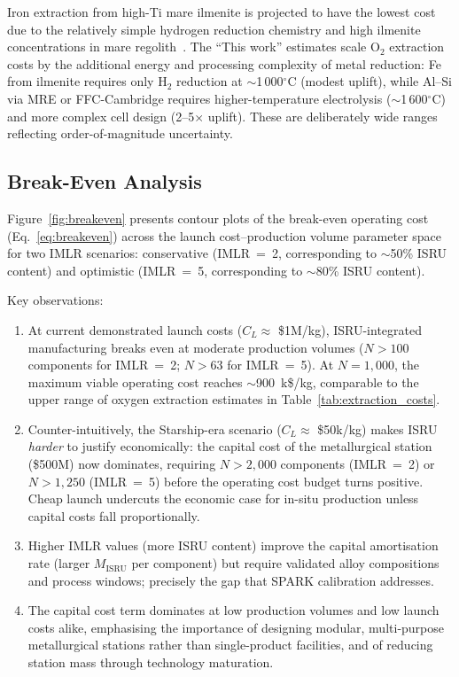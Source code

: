\documentclass[11pt,a4paper]{article}
\begin{document}
Iron extraction from high-Ti mare ilmenite is projected to have the lowest cost due to the relatively simple hydrogen reduction chemistry and high ilmenite concentrations in mare regolith~\cite{Sanders2013, Anand2012}. The ``This work'' estimates scale O$_2$ extraction costs by the additional energy and processing complexity of metal reduction: Fe from ilmenite requires only H$_2$ reduction at $\sim$1\,000$^\circ$C (modest uplift), while Al--Si via MRE or FFC-Cambridge requires higher-temperature electrolysis ($\sim$1\,600$^\circ$C) and more complex cell design (2--5$\times$ uplift). These are deliberately wide ranges reflecting order-of-magnitude uncertainty.

\subsection{Break-Even Analysis}
\label{subsec:breakeven_analysis}

Figure~\ref{fig:breakeven} presents contour plots of the break-even operating cost (Eq.~\ref{eq:breakeven}) across the launch cost--production volume parameter space for two IMLR scenarios: conservative (IMLR~=~2, corresponding to $\sim$50\% ISRU content) and optimistic (IMLR~=~5, corresponding to $\sim$80\% ISRU content).

Key observations:
\begin{enumerate}[leftmargin=1.4em]
    \item At current demonstrated launch costs ($C_L \approx$ \$1M/kg), ISRU-integrated manufacturing breaks even at moderate production volumes ($N > 100$ components for IMLR~=~2; $N > 63$ for IMLR~=~5). At $N = 1{,}000$, the maximum viable operating cost reaches $\sim$900~k\$/kg, comparable to the upper range of oxygen extraction estimates in Table~\ref{tab:extraction_costs}.

    \item Counter-intuitively, the Starship-era scenario ($C_L \approx$ \$50k/kg) makes ISRU \emph{harder} to justify economically: the capital cost of the metallurgical station (\$500M) now dominates, requiring $N > 2{,}000$ components (IMLR~=~2) or $N > 1{,}250$ (IMLR~=~5) before the operating cost budget turns positive. Cheap launch undercuts the economic case for in-situ production unless capital costs fall proportionally.

    \item Higher IMLR values (more ISRU content) improve the capital amortisation rate (larger $M_{\text{ISRU}}$ per component) but require validated alloy compositions and process windows; precisely the gap that SPARK calibration addresses.

    \item The capital cost term dominates at low production volumes and low launch costs alike, emphasising the importance of designing modular, multi-purpose metallurgical stations rather than single-product facilities, and of reducing station mass through technology maturation.
\end{enumerate}
\end{document}
